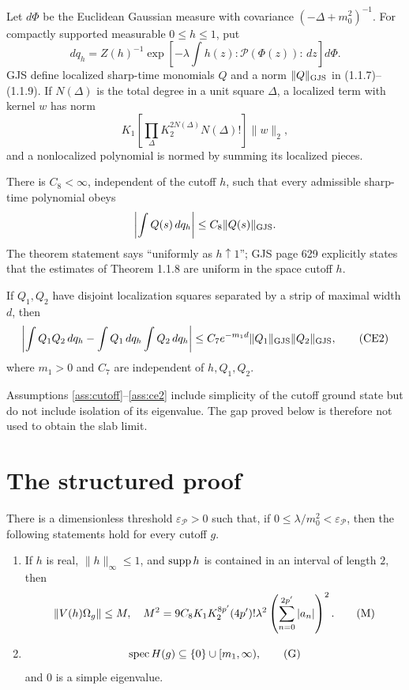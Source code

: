 \documentclass[11pt,a4paper]{article}
\begin{document}
Let $d\Phi$ be the Euclidean Gaussian measure with covariance
$(-\Delta+m_0^2)^{-1}$.  For compactly supported measurable $0\leq h\leq1$, put
\[
 dq_h=Z(h)^{-1}\exp\!\left[-\lambda\int h(z){:}\mathscr P(\Phi(z)){:}\,dz\right]d\Phi.
\]
GJS define localized sharp-time monomials $Q$ and a norm $\|Q\|_{\rm GJS}$ in
(1.1.7)--(1.1.9).  If $N(\Delta)$ is the total degree in a unit square $\Delta$, a
localized term with kernel $w$ has norm
\[
 K_1\left[\prod_\Delta K_2^{2N(\Delta)}N(\Delta)!\right]\|w\|_2,
\]
and a nonlocalized polynomial is normed by summing its localized pieces.

\begin{assumption}\label{ass:ce1}
There is $C_8<\infty$, independent of the cutoff $h$, such that every admissible
sharp-time polynomial obeys
\[
 \left|\int Q(s)\,dq_h\right|\leq C_8\|Q(s)\|_{\rm GJS}.
\]
The theorem statement says ``uniformly as $h\uparrow1$''; GJS page 629 explicitly
states that the estimates of Theorem 1.1.8 are uniform in the space cutoff $h$.
\end{assumption}

\begin{assumption}\label{ass:ce2}
If $Q_1,Q_2$ have disjoint localization squares separated by a strip of maximal
width $d$, then
\[
 \left|\int Q_1Q_2\,dq_h-\int Q_1\,dq_h\int Q_2\,dq_h\right|
 \leq C_7e^{-m_1d}\|Q_1\|_{\rm GJS}\|Q_2\|_{\rm GJS},                 \tag{CE2}
\]
where $m_1>0$ and $C_7$ are independent of $h,Q_1,Q_2$.
\end{assumption}

\begin{remark}
Assumptions \ref{ass:cutoff}--\ref{ass:ce2} include simplicity of the cutoff ground
state but do not include isolation of its eigenvalue.  The gap proved below is therefore
not used to obtain the slab limit.
\end{remark}

\section{The structured proof}

\begin{theorem}\label{thm:EG}
There is a dimensionless threshold $\varepsilon_{\mathscr P}>0$ such that, if
$0\leq\lambda/m_0^2<\varepsilon_{\mathscr P}$, then the following statements hold
for every cutoff $g$.

\begin{enumerate}[label=\textup{(\roman*)}]
\item If $h$ is real, $\|h\|_\infty\leq1$, and $\operatorname{supp} h$ is contained in an
interval of length $2$, then
\[
 \|V(h)\Omega_g\|\leq M,
 \quad
 M^2=9C_8K_1K_2^{8p'}(4p')!\lambda^2
       \left(\sum_{n=0}^{2p'}|a_n|\right)^2.                         \tag{M}
\]
\item
\[
 \operatorname{spec} H(g)\subseteq\{0\}\cup[m_1,\infty),                         \tag{G}
\]
and $0$ is a simple eigenvalue.
\end{enumerate}
\end{theorem}
\end{document}

